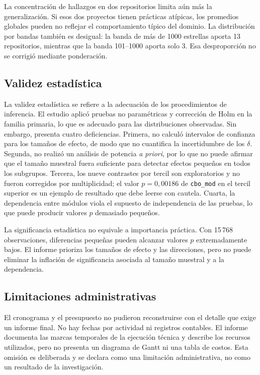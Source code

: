 La concentración de hallazgos en dos repositorios limita aún más la generalización. Si esos dos proyectos tienen prácticas atípicas, los promedios globales pueden no reflejar el comportamiento típico del dominio. La distribución por bandas también es desigual: la banda de más de 1000 estrellas aporta 13 repositorios, mientras que la banda 101--1000 aporta solo 3. Esa desproporción no se corrigió mediante ponderación.

\subsection{Validez estadística}

La validez estadística se refiere a la adecuación de los procedimientos de inferencia. El estudio aplicó pruebas no paramétricas y corrección de Holm en la familia primaria, lo que es adecuado para las distribuciones observadas. Sin embargo, presenta cuatro deficiencias. Primera, no calculó intervalos de confianza para los tamaños de efecto, de modo que no cuantifica la incertidumbre de los $\delta$. Segunda, no realizó un análisis de potencia \emph{a priori}, por lo que no puede afirmar que el tamaño muestral fuera suficiente para detectar efectos pequeños en todos los subgrupos. Tercera, los nueve contrastes por tercil son exploratorios y no fueron corregidos por multiplicidad; el valor $p=0{,}00186$ de \texttt{cbo\_mod} en el tercil superior es un ejemplo de resultado que debe leerse con cautela. Cuarta, la dependencia entre módulos viola el supuesto de independencia de las pruebas, lo que puede producir valores $p$ demasiado pequeños.

La significancia estadística no equivale a importancia práctica. Con 15\,768 observaciones, diferencias pequeñas pueden alcanzar valores $p$ extremadamente bajos. El informe prioriza los tamaños de efecto y las direcciones, pero no puede eliminar la inflación de significancia asociada al tamaño muestral y a la dependencia.

\subsection{Limitaciones administrativas}

El cronograma y el presupuesto no pudieron reconstruirse con el detalle que exige un informe final. No hay fechas por actividad ni registros contables. El informe documenta las marcas temporales de la ejecución técnica y describe los recursos utilizados, pero no presenta un diagrama de Gantt ni una tabla de costos. Esta omisión es deliberada y se declara como una limitación administrativa, no como un resultado de la investigación.

